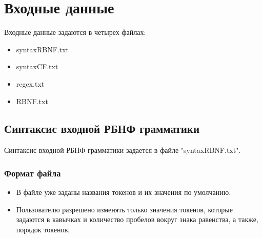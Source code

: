 \documentclass[12pt]{article}
\begin{document}
    \clearpage


    \section{Входные данные}

    Входные данные задаются в четырех файлах:
    \begin{itemize}[noitemsep,topsep=0pt,parsep=0pt,partopsep=0pt]
        \item syntaxRBNF.txt
        \item syntaxCF.txt
        \item regex.txt
        \item RBNF.txt
    \end{itemize}


    \subsection{Синтаксис входной РБНФ грамматики}

    Синтаксис входной РБНФ грамматики задается в файле "syntaxRBNF.txt".

    \subsubsection*{Формат файла}
    \begin{itemize}
        \item В файле уже заданы названия токенов и их значения по умолчанию.
        \item Пользователю разрешено изменять только значения токенов, которые задаются в кавычках и количество пробелов вокруг знака равенства, а также, порядок токенов.
    \end{itemize}
\end{document}
